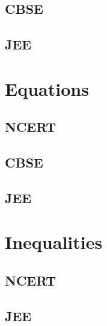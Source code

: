 \documentclass[journal]{IEEEtran}
\begin{document}
\subsection{CBSE}
 
\subsection{JEE}
 
\section{Equations}
\subsection{NCERT}
 
\subsection{CBSE}
 
\subsection{JEE}
 
\section{Inequalities}
\subsection{NCERT}

\subsection{JEE}

\fi
\end{document}
